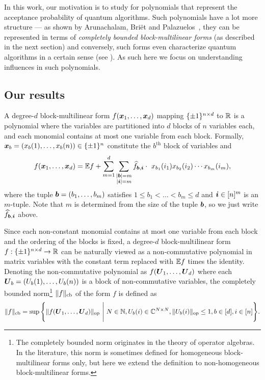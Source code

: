 In this work, our motivation is to study  for polynomials that represent the acceptance probability of quantum algorithms. Such polynomials have a lot more structure --- as shown by  Arunachalam, Bri\"et and Palazuelos~\cite{ABP18}, they can be represented in terms of \emph{completely bounded block-multilinear forms} (as described in the next section) and conversely, such forms even characterize quantum algorithms in a certain sense (see ). As such here we focus on understanding influences in such polynomials.



\subsection{Our results}

A degree-$d$ block-multilinear form $f(\boldsymbol{x}_1, \ldots, \boldsymbol{x}_d)$ mapping $\{\pm 1\}^{n \times d}$ to ${\mathbb R}$ is a polynomial where the variables are partitioned into $d$ blocks of $n$ variables each, and each monomial contains at most one variable from each block. Formally, $\boldsymbol{x}_b = (x_b(1), \ldots, x_b(n)) \in \{\pm 1\}^n$ constitute the $b^\text{th}$ block of variables and 
\begin{equation}\label{eqn:tensor}
    f(\boldsymbol{x}_1,\ldots, \boldsymbol{x}_d) =  \mathbb{E} f +  \sum_{m = 1}^d \sum_{\substack{|\boldsymbol{b}|=m\\|{\boldsymbol{i}}|=m}} \widehat{f}_{\boldsymbol{b}, {\boldsymbol{i}}} \cdot  ~x_{b_1}(i_1)x_{b_2}(i_2)\cdots x_{b_m}({i_m}),
\end{equation}
where the tuple $\boldsymbol{b}  = (b_1, \ldots, b_m)$ satisfies $1 \le b_1 < \ldots < b_m \le d$ and ${\boldsymbol{i}} \in [n]^m$ is an $m$-tuple. Note that $m$
 is determined from the size of the tuple $\boldsymbol{b}$, so we just write $\widehat{f}_{\boldsymbol{b}, {\boldsymbol{i}}}$ above.  

 Since each non-constant monomial contains at most one variable from each block and the ordering of the blocks is fixed, a degree-$d$ block-multilinear form $f: \{\pm 1\}^{n \times d} \to {\mathbb R}$ can be naturally viewed as a non-commutative polynomial in matrix variables with the constant term replaced with $\mathbb{E} f$ times the identity. Denoting the non-commutative polynomial as $f(\boldsymbol{U}_1, \ldots, \boldsymbol{U}_d)$ where each $\boldsymbol{U}_b = (U_b(1), \ldots, U_b(n))$ is a block of non-commutative variables, the completely bounded norm\footnote{The completely bounded norm originates in the theory of operator algebras. In the literature, this norm is sometimes defined for homogeneous block-multilinear forms only, but here we extend the definition to non-homogeneous block-multilinear forms.}  $\|f\|_{\mathrm{cb}}$ of the form $f$ is defined as
\[ 
\|f\|_{\mathrm{cb}} = \sup\Bigg\{\|f(\boldsymbol{U}_1, \ldots, \boldsymbol{U}_d)\|_{\mathrm{op}} ~\Bigg|~  N \in \mathbb{N}, U_b(i) \in \mathbb{C}^{N \times N}, \|U_b(i)\|_{\mathrm{op}} \le 1, b \in[d], i\in [n]\Bigg\}.
\]

